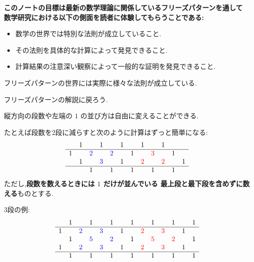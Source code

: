 \documentclass[12pt,twoside,dvipdfm]{jarticle}
\newcommand\red{\color{red}}
\newcommand\blue{\color{blue}}
\renewcommand\r{\red}
\renewcommand\b{\blue}
\theoremstyle{definition} %
\theoremstyle{definition} %
\theoremstyle{definition} %
\numberwithin{theorem}{section}
\numberwithin{equation}{section}
\numberwithin{figure}{section}
\numberwithin{table}{section}
\begin{document}
{\bf
このノートの目標は最新の数学理論に関係しているフリーズパターンを通して
数学研究における以下の側面を読者に体験してもらうことである:
\begin{itemize}
\item 数学の世界では特別な法則が成立していること.
\item その法則を具体的な計算によって発見できること.
\item 計算結果の注意深い観察によって一般的な証明を発見できること.
\end{itemize}
フリーズパターンの世界には実際に様々な法則が成立している.
}

フリーズパターンの解説に戻ろう.

縦方向の段数や左端の $1$ の並び方は自由に変えることができる. 

たとえば段数を2段に減らすと次のように計算はずっと簡単になる:
\begin{equation}
\begin{array}{cccccccccccc}
  & 1 &   & 1 &   & 1 &   & 1 &   & 1 &   &   \\ \hline
1 &   &\b2&   &\b2&   & 1 &   &\r3&   & 1 &   \\
  & 1 &   &\b3&   & 1 &   &\r2&   &\r2&   & 1 \\ \hline
  &   & 1 &   & 1 &   & 1 &   & 1 &   & 1 &   \\
\end{array}
\label{eq:CCFA2}
\end{equation}
ただし,{\bf 段数を数えるときには $1$ だけが並んでいる
最上段と最下段を含めずに数える}ものとする.

3段の例:
\begin{equation}
\begin{array}{cccccccccccccc}
  & 1 &   & 1 &   & 1 &   & 1 &   & 1 &   & 1 &   & 1 \\ \hline
1 &   &\b2&   &\b3&   & 1 &   &\r2&   &\r3&   & 1 &   \\
  & 1 &   &\b5&   &\b2&   & 1 &   &\r5&   &\r2&   & 1 \\
1 &   &\b2&   &\b3&   & 1 &   &\r2&   &\r3&   & 1 &   \\ \hline
  & 1 &   & 1 &   & 1 &   & 1 &   & 1 &   & 1 &   & 1 \\
\end{array}
\label{eq:CCFA3}
\end{equation}
 
\end{document}
